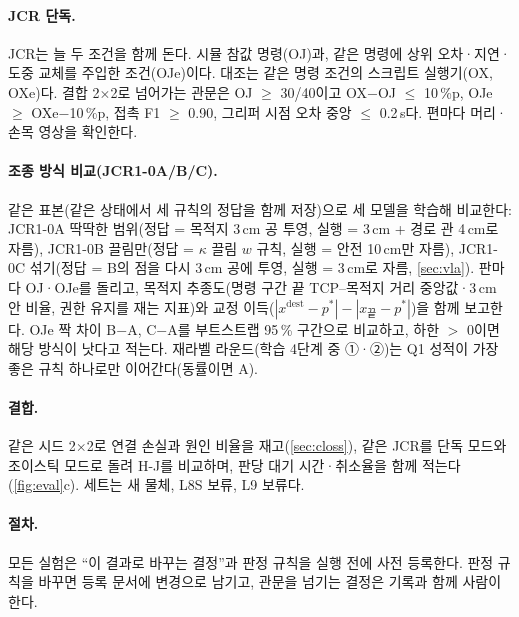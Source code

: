 \paragraph{JCR 단독.} JCR는 늘 두 조건을 함께 돈다. 시뮬 참값 명령(OJ)과, 같은 명령에 상위 오차·지연·도중 교체를 주입한 조건(OJe)이다. 대조는 같은 명령 조건의 스크립트 실행기(OX, OXe)다. 결합 2$\times$2로 넘어가는 관문은 OJ $\ge$ 30/40이고 OX$-$OJ $\le$ 10\,\%p, OJe $\ge$ OXe$-$10\,\%p, 접촉 F1 $\ge$ 0.90, 그리퍼 시점 오차 중앙 $\le$ 0.2\,s다. 편마다 머리·손목 영상을 확인한다.

\paragraph{조종 방식 비교(JCR1-0A/B/C).} 같은 표본(같은 상태에서 세 규칙의 정답을 함께 저장)으로 세 모델을 학습해 비교한다: JCR1-0A 딱딱한 범위(정답 = 목적지 3\,cm 공 투영, 실행 = 3\,cm + 경로 관 4\,cm로 자름), JCR1-0B 끌림만(정답 = $\kappa$ 끌림 $w$ 규칙, 실행 = 안전 10\,cm만 자름), JCR1-0C 섞기(정답 = B의 점을 다시 3\,cm 공에 투영, 실행 = 3\,cm로 자름, \cref{sec:vla}). 판마다 OJ·OJe를 돌리고, 목적지 추종도(명령 구간 끝 TCP--목적지 거리 중앙값·3\,cm 안 비율, 권한 유지를 재는 지표)와 교정 이득($|x^{\text{dest}} - p^\ast| - |x_{\text{끝}} - p^\ast|$)을 함께 보고한다. OJe 짝 차이 B$-$A, C$-$A를 부트스트랩 95\,\% 구간으로 비교하고, 하한 $>$ 0이면 해당 방식이 낫다고 적는다. 재라벨 라운드(학습 4단계 중 ①·②)는 Q1 성적이 가장 좋은 규칙 하나로만 이어간다(동률이면 A).

\paragraph{결합.} 같은 시드 2$\times$2로 연결 손실과 원인 비율을 재고(\cref{sec:closs}), 같은 JCR를 단독 모드와 조이스틱 모드로 돌려 H-J를 비교하며, 판당 대기 시간·취소율을 함께 적는다(\cref{fig:eval}c). 세트는 새 물체, L8S 보류, L9 보류다.

\paragraph{절차.} 모든 실험은 ``이 결과로 바꾸는 결정''과 판정 규칙을 실행 전에 사전 등록한다. 판정 규칙을 바꾸면 등록 문서에 변경으로 남기고, 관문을 넘기는 결정은 기록과 함께 사람이 한다.
